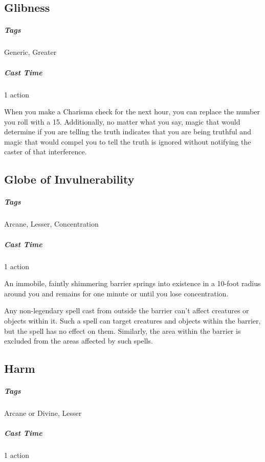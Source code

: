 

\subsection{Glibness}\label{spell:glibness}
\subparagraph*{Tags} Generic, Greater
\subparagraph*{Cast Time} 1 action

When you make a Charisma check for the next hour, you can replace the number you roll with a 15. Additionally, no matter what you say, magic that would determine if you are telling the truth indicates that you are being truthful and magic that would compel you to tell the truth is ignored without notifying the caster of that interference.

\subsection{Globe of Invulnerability}\label{spell:globe-of-invulnerability}
\subparagraph*{Tags} Arcane, Lesser, Concentration
\subparagraph*{Cast Time} 1 action

An immobile, faintly shimmering barrier springs into existence in a 10-foot radius around you and remains for one minute or until you lose concentration.

Any non-legendary spell cast from outside the barrier can't affect creatures or objects within it. Such a spell can target creatures and objects within the barrier, but the spell has no effect on them. Similarly, the area within the barrier is excluded from the areas affected by such spells.

\subsection{Harm}\label{spell:harm}
\subparagraph*{Tags} Arcane or Divine, Lesser
\subparagraph*{Cast Time} 1 action


